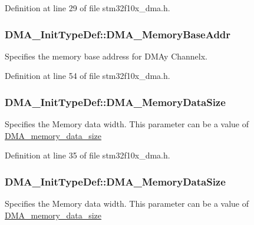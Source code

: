 Definition at line 29 of file stm32f10x\+\_\+dma.\+h.

\subsubsection[{\texorpdfstring{D\+M\+A\+\_\+\+Memory\+Base\+Addr}{DMA_MemoryBaseAddr}}]{ D\+M\+A\+\_\+\+Init\+Type\+Def\+::\+D\+M\+A\+\_\+\+Memory\+Base\+Addr}\hypertarget{struct_d_m_a___init_type_def_a41e7d463f0cfbcedf3170d7d27d088df}{}\label{struct_d_m_a___init_type_def_a41e7d463f0cfbcedf3170d7d27d088df}
Specifies the memory base address for D\+M\+Ay Channelx. 

Definition at line 54 of file stm32f10x\+\_\+dma.\+h.

\subsubsection[{\texorpdfstring{D\+M\+A\+\_\+\+Memory\+Data\+Size}{DMA_MemoryDataSize}}]{ D\+M\+A\+\_\+\+Init\+Type\+Def\+::\+D\+M\+A\+\_\+\+Memory\+Data\+Size}\hypertarget{struct_d_m_a___init_type_def_a2bd79633728a62e6622dade595a44ab9}{}\label{struct_d_m_a___init_type_def_a2bd79633728a62e6622dade595a44ab9}
Specifies the Memory data width. This parameter can be a value of \hyperlink{group___d_m_a__memory__data__size}{D\+M\+A\+\_\+memory\+\_\+data\+\_\+size} 

Definition at line 35 of file stm32f10x\+\_\+dma.\+h.

\subsubsection[{\texorpdfstring{D\+M\+A\+\_\+\+Memory\+Data\+Size}{DMA_MemoryDataSize}}]{ D\+M\+A\+\_\+\+Init\+Type\+Def\+::\+D\+M\+A\+\_\+\+Memory\+Data\+Size}\hypertarget{struct_d_m_a___init_type_def_a74bb71921c4d198d6cf1979c120f694f}{}\label{struct_d_m_a___init_type_def_a74bb71921c4d198d6cf1979c120f694f}
Specifies the Memory data width. This parameter can be a value of \hyperlink{group___d_m_a__memory__data__size}{D\+M\+A\+\_\+memory\+\_\+data\+\_\+size} 

